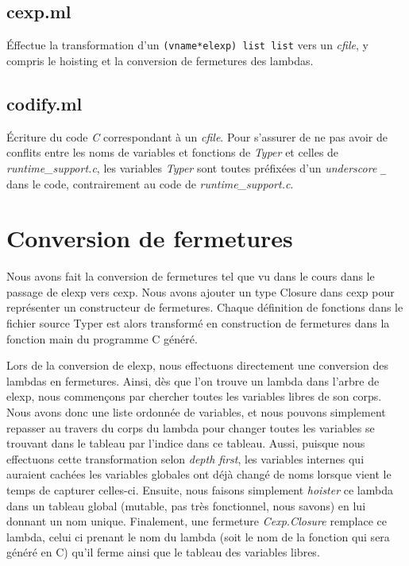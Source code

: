 \documentclass{article}
\begin{document}
\subsection{cexp.ml}
Éffectue la transformation d'un \texttt{(vname*elexp) list list} vers un
\emph{cfile}, y compris le hoisting et la conversion de fermetures des lambdas.

\subsection{codify.ml}
Écriture du code \emph{C} correspondant à un \emph{cfile}. Pour s'assurer de ne
pas avoir de conflits entre les noms de variables et fonctions de \emph{Typer}
et celles de \emph{runtime\_support.c}, les variables \emph{Typer} sont toutes
préfixées d'un \emph{underscore} \texttt{\_} dans le code, contrairement au code
de \emph{runtime\_support.c}.


\section{Conversion de fermetures}
Nous avons fait la conversion de fermetures tel que vu dans le cours dans le
passage de elexp vers cexp. Nous avons ajouter un type Closure dans cexp pour
représenter un constructeur de fermetures. Chaque définition de fonctions dans
le fichier source Typer est alors transformé en construction de fermetures
dans la fonction main du programme C généré.


Lors de la conversion de elexp, nous effectuons directement une conversion des
lambdas en fermetures. Ainsi, dès que l'on trouve un lambda dans l'arbre de
elexp, nous commençons par chercher toutes les variables libres de son corps.
\cite{closureconversion} Nous avons donc une liste ordonnée de variables, et
nous pouvons simplement repasser au travers du corps du lambda pour changer
toutes les variables se trouvant dans le tableau par l'indice dans ce tableau.
Aussi, puisque nous effectuons cette transformation selon \emph{depth first},
les variables internes qui auraient cachées les variables globales ont déjà
changé de noms lorsque vient le temps de capturer celles-ci. Ensuite, nous
faisons simplement \emph{hoister} ce lambda dans un tableau global (mutable,
pas très fonctionnel, nous savons) en lui donnant un nom unique. Finalement,
une fermeture \emph{Cexp.Closure} remplace ce lambda, celui ci prenant le nom
du lambda (soit le nom de la fonction qui sera généré en C) qu'il ferme ainsi
que le tableau des variables libres.
\end{document}
